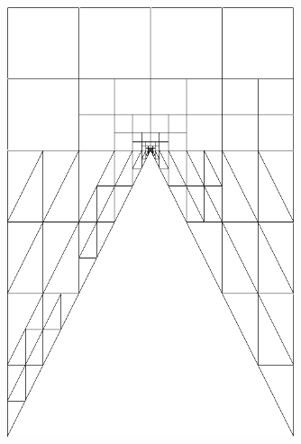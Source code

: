 \documentclass{beamer}
\begin{document}
\begin{frame}
{\begin{columns}
\begin{column}{0.49\textwidth}
\begin{figure}
\includegraphics[width=0.75\textwidth]{Wedge/modified16c_mesh.png}
\end{figure}
\end{column}
\end{columns}
}
\end{frame}

\end{document}
